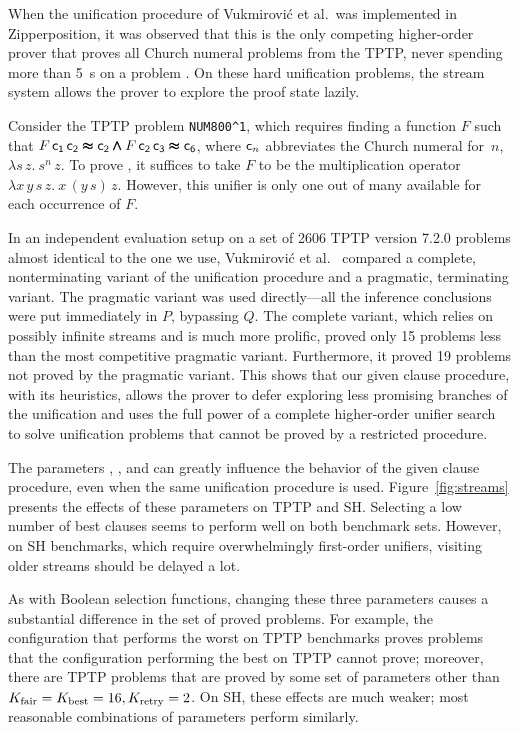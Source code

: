 \documentclass[smallcondensed,draft]{svjour3}     %
\begin{document}

When the unification procedure of Vukmirović et al.\ was implemented  in
Zipperposition, it was observed that this is the only competing
higher-order prover that proves all Church numeral problems from the TPTP,
never spending more than 5~s on a problem \cite{our-unif-paper}. On these hard
unification problems, the stream system allows the prover to explore the proof
state lazily.

Consider the TPTP problem \verb|NUM800^1|, which requires finding
a function $F$ such that $F \, {\mathsf{c_1}} \, {\mathsf{c_2}}
\pmb\approx {\mathsf{c_2}} \pmb\land F \, {\mathsf{c_2}} \, {\mathsf{c_3}} \pmb\approx {\mathsf{c_6}}$, where
${\mathsf{c}}_n$ abbreviates the Church numeral for~$n$, $\lambda s\, z. \>
s^n \, z$. To prove
, it suffices to take $F$ to be the multiplication operator
$\lambda x \, y \, s \, z. \> x \, (y \, s) \, z$.
However, this unifier is only one out of many available for each occurrence of
$F$.

In an independent evaluation setup on a set of 2606 TPTP version 7.2.0
problems almost identical to the one we use, Vukmirović et al.\
\cite[Sect.~7]{our-unif-paper}
compared a complete, nonterminating variant of the unification procedure and a
pragmatic, terminating variant. The
pragmatic variant was used directly---all the inference conclusions were put
immediately in $P$, bypassing $Q$. The complete variant, which relies on
possibly infinite streams and is much more prolific, proved only 15  problems
less than the most competitive pragmatic variant. Furthermore, it proved 19
problems not proved by the pragmatic variant.
%
This shows that our given clause procedure, with its heuristics, allows the
prover to defer exploring less promising branches of the unification and uses
the full power of a complete higher-order unifier search to solve unification
problems that cannot be proved by a restricted procedure.

The parameters \ParamMode{}, \ParamRetry{}, and \ParamMaxStreams{} can greatly
influence the behavior of the given clause procedure, even when the same
unification procedure is used. Figure~\ref{fig:streams}
presents the effects of these parameters on TPTP and SH.
Selecting a low number of best clauses seems to
perform well on both benchmark sets. However, on SH benchmarks, which require
overwhelmingly first-order unifiers, visiting older streams should be delayed
a lot.

As with Boolean selection functions, changing these three parameters causes
a substantial difference in the set of proved problems. For example, the
configuration that performs the worst on TPTP benchmarks proves 
problems that the configuration performing the best on TPTP cannot prove; moreover, there
are \NumberOK{29} TPTP problems that are proved by some set of parameters
other than $K_{\mathrm{fair}}=K_{\mathrm{best}}=16, K_{\mathrm{retry}}=2$. On SH, these
effects are much weaker; most reasonable combinations
of parameters perform similarly.
\end{document}
